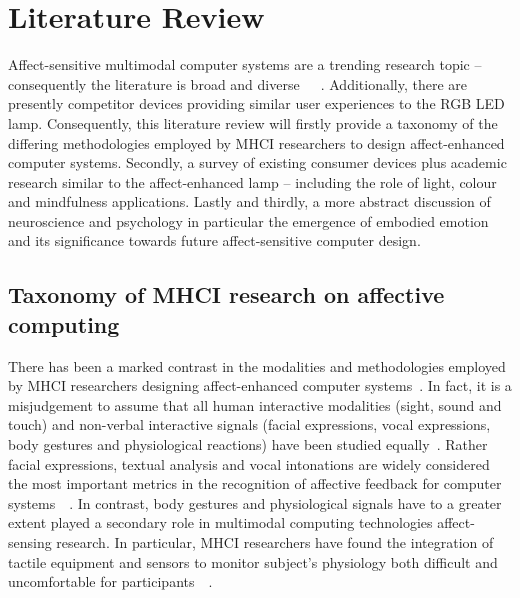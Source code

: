 \documentclass{sigchi}
\begin{document}
\section{Literature Review}

Affect-sensitive multimodal computer systems are a trending research topic – consequently the literature is broad and diverse~\cite{marechal2019survey}~\cite{pantic2003toward}~\cite{pantic2008human}. Additionally, there are presently competitor devices providing similar user experiences to the RGB LED lamp. Consequently, this literature review will firstly provide a taxonomy of the differing methodologies employed by MHCI researchers to design affect-enhanced computer systems. Secondly, a survey of existing consumer devices plus academic research similar to the affect-enhanced lamp – including the role of light, colour and mindfulness applications. Lastly and thirdly, a more abstract discussion of neuroscience and psychology in particular the emergence of embodied emotion and its significance towards future affect-sensitive computer design. 

\subsection{Taxonomy of MHCI research on affective computing}

There has been a marked contrast in the modalities and methodologies employed by MHCI researchers designing affect-enhanced computer systems~\cite{pantic2008human}. In fact, it is a misjudgement to assume that all human interactive modalities (sight, sound and touch) and non-verbal interactive signals (facial expressions, vocal expressions, body gestures and physiological reactions) have been studied equally~\cite{pantic2003toward}. Rather facial expressions, textual analysis and vocal intonations are widely considered the most important metrics in the recognition of affective feedback for computer systems~\cite{marechal2019survey}~\cite{pantic2008human}. In contrast, body gestures and physiological signals have to a greater extent played a secondary role in multimodal computing technologies affect-sensing research. In particular, MHCI researchers have found the integration of tactile equipment and sensors to monitor subject’s physiology both difficult and uncomfortable for participants~\cite{pantic2008human}~\cite{5771346}.
\end{document}

